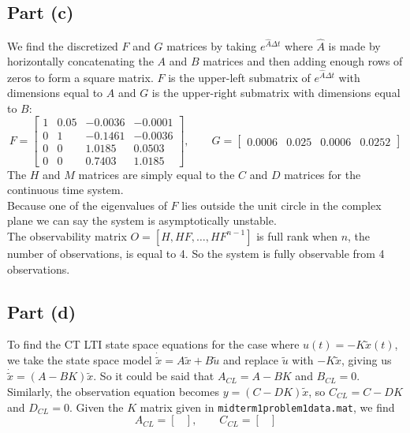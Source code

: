 \documentclass[11pt]{article}
\begin{document}
\subsection*{Part (c)}
We find the discretized $F$ and $G$ matrices by taking $e^{\hat{A}\Delta t}$ where $\hat{A}$ is made by horizontally concatenating the $A$ and $B$ matrices and then adding enough rows of zeros to form a square matrix. $F$ is the upper-left submatrix of $e^{\hat{A}\Delta t}$ with dimensions equal to $A$ and $G$ is the upper-right submatrix with dimensions equal to $B$:
\begin{equation*}
	F = \begin{bmatrix} 1 & 0.05 & -0.0036 & -0.0001 \\
						0 & 1 & -0.1461 & -0.0036 \\
						0 & 0 & 1.0185 & 0.0503 \\
						0 & 0 & 0.7403 & 1.0185 \end{bmatrix},\qquad
	G = \begin{bmatrix} 0.0006 & 0.025 & 0.0006 & 0.0252 \end{bmatrix}
\end{equation*}
The $H$ and $M$ matrices are simply equal to the $C$ and $D$ matrices for the continuous time system. \\
Because one of the eigenvalues of $F$ lies outside the unit circle in the complex plane we can say the system is asymptotically unstable. \\
The observability matrix $O = [H, HF, \dots, HF^{n-1}]$ is full rank when $n$, the number of observations, is equal to 4. So the system is fully observable from 4 observations.

\subsection*{Part (d)}
To find the CT LTI state space equations for the case where $u(t)=-K\tilde{x}(t)$, we take the state space model $\dot{\tilde{x}}=A\tilde{x}+B\tilde{u}$ and replace $\tilde{u}$ with $-K\tilde{x}$, giving us $\dot{\tilde{x}}=(A-BK)\tilde{x}$. So it could be said that $A_{CL}=A-BK$ and $B_{CL}=0$. Similarly, the observation equation becomes $y=(C-DK)\tilde{x}$, so $C_{CL}=C-DK$ and $D_{CL}=0$. Given the $K$ matrix given in \texttt{midterm1problem1data.mat}, we find
\begin{equation*}
	A_{CL} = \begin{bmatrix} \end{bmatrix},\qquad C_{CL} = \begin{bmatrix} \end{bmatrix}
\end{equation*}
\end{document}
